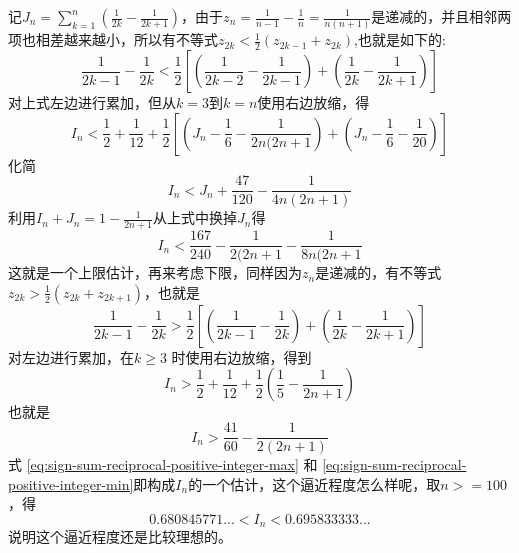 记$J_n=\sum_{k=1}^n(\frac{1}{2k}-\frac{1}{2k+1})$，由于$z_n=\frac{1}{n-1}-\frac{1}{n}=\frac{1}{n(n+1)}$是递减的，并且相邻两项也相差越来越小，所以有不等式$z_{2k}<\frac{1}{2}(z_{2k-1}+z_{2k})$,也就是如下的:
\begin{equation*}
  \frac{1}{2k-1} - \frac{1}{2k} < \frac{1}{2} \left[ \left( \frac{1}{2k-2} - \frac{1}{2k-1} \right) + \left( \frac{1}{2k} - \frac{1}{2k+1} \right) \right]
\end{equation*}
对上式左边进行累加，但从$k=3$到$k=n$使用右边放缩，得
\begin{equation*}
  I_n<\frac{1}{2}+\frac{1}{12}+\frac{1}{2} \left[ \left( J_n-\frac{1}{6}-\frac{1}{2n(2n+1} \right) + \left( J_n-\frac{1}{6}-\frac{1}{20} \right) \right]
\end{equation*}
化简
\begin{equation*}
 I_n<J_n+\frac{47}{120} - \frac{1}{4n(2n+1)}
\end{equation*}
利用$I_n+J_n=1-\frac{1}{2n+1}$从上式中换掉$J_n$得
\begin{equation}
  \label{eq:sign-sum-reciprocal-positive-integer-max}
  I_n<\frac{167}{240}-\frac{1}{2(2n+1}-\frac{1}{8n(2n+1}
\end{equation}
这就是一个上限估计，再来考虑下限，同样因为$z_n$是递减的，有不等式$z_{2k}>\frac{1}{2}(z_{2k}+z_{2k+1})$，也就是
\begin{equation*}
  \frac{1}{2k-1} - \frac{1}{2k} > \frac{1}{2} \left[ \left( \frac{1}{2k-1} - \frac{1}{2k} \right) + \left( \frac{1}{2k} - \frac{1}{2k+1} \right) \right]
\end{equation*}
对左边进行累加，在$k \geqslant 3$ 时使用右边放缩，得到
\begin{equation*}
  I_n > \frac{1}{2} + \frac{1}{12} + \frac{1}{2} \left( \frac{1}{5} - \frac{1}{2n+1} \right)
\end{equation*}
也就是
\begin{equation}
  \label{eq:sign-sum-reciprocal-positive-integer-min}
 I_n > \frac{41}{60} -\frac{1}{2(2n+1)} 
\end{equation}
式 \ref{eq:sign-sum-reciprocal-positive-integer-max} 和 \ref{eq:sign-sum-reciprocal-positive-integer-min}即构成$I_n$的一个估计，这个逼近程度怎么样呢，取$n>=100$，得
\begin{equation*}
  0.680845771... < I_n < 0.695833333...
\end{equation*}
说明这个逼近程度还是比较理想的。

